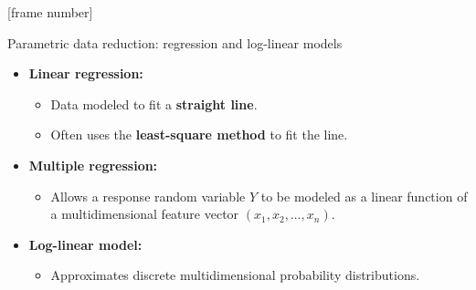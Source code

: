 \documentclass[aspectratio=169,t]{beamer}
\begin{document}
  {
    [frame number]
    \begin{frame}{Parametric data reduction: regression and log-linear models}
    \begin{itemize}
      \item \textbf{Linear regression:}
      \begin{itemize}
        \item Data modeled to fit a \textbf{{\color{airforceblue}straight line}}.
        \item Often uses the \textbf{{\color{airforceblue}least-square method}} to fit the line.
      \end{itemize}
      \item \textbf{Multiple regression:}
      \begin{itemize}
        \item Allows a response random variable $Y$ to be modeled as a linear function of a multidimensional feature vector $(x_1, x_2,\ldots, x_n)$.
      \end{itemize}
      \item \textbf{Log-linear model:}
      \begin{itemize}
        \item Approximates discrete multidimensional probability distributions.
      \end{itemize}
    \end{itemize}
    \end{frame}
  }
\end{document}
